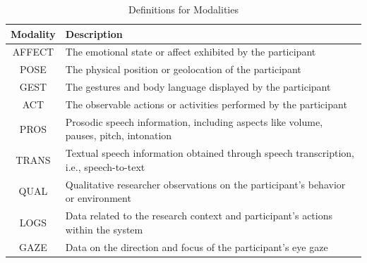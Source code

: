 \documentclass[manuscript,screen,review]{acmart}
\begin{document}
\begin{table}[ht]
  \centering
  \caption{Definitions for Modalities}
  \begin{tabular}{|c|p{}|}
    \hline
    \textbf{Modality} & \textbf{Description} \\
    \hline
    AFFECT & The emotional state or affect exhibited by the participant \\
    \hline
    POSE & The physical position or geolocation of the participant \\
    \hline
    GEST & The gestures and body language displayed by the participant \\
    \hline
    ACT & The observable actions or activities performed by the participant \\
    \hline
    PROS & Prosodic speech information, including aspects like volume, pauses, pitch, intonation \\
    \hline
    TRANS & Textual speech information obtained through speech transcription, i.e., speech-to-text \\
    \hline
    QUAL & Qualitative researcher observations on the participant's behavior or environment \\
    \hline
    LOGS & Data related to the research context and participant's actions within the system \\
    \hline
    GAZE & Data on the direction and focus of the participant's eye gaze \\
    \hline


\end{tabular}
\end{table}
\end{document}
